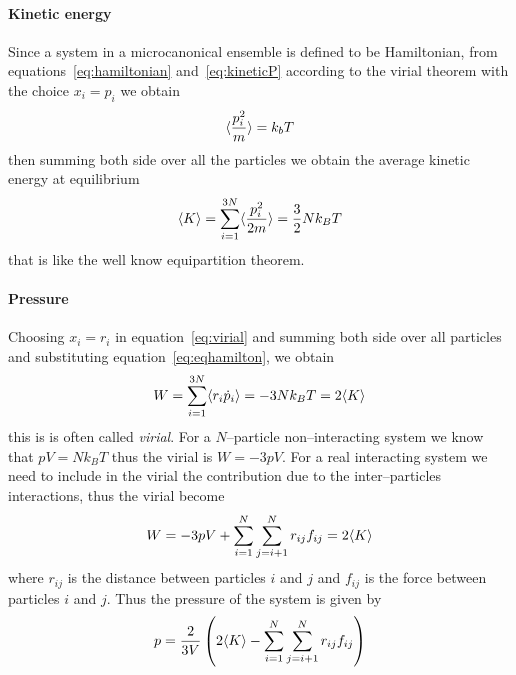 \paragraph{\textbf{Kinetic energy}} Since a system in a microcanonical ensemble is defined to be Hamiltonian, from equations~\eqref{eq:hamiltonian} and~\eqref{eq:kineticP} according to the virial theorem with the choice $x_i = p_i$ we obtain
\begin{equation*}
	\langle \frac{p^2_i}{m} \rangle = k_bT
\end{equation*}
then summing both side over all the particles we obtain the average kinetic energy at equilibrium
\begin{equation}
	\langle K \rangle = \sum_{i=1}^{3N} \langle \frac{p_i^2}{2m} \rangle = \frac{3}{2}Nk_B T
	\label{eq:kineticT}
\end{equation}
that is like the well know equipartition theorem.

\paragraph{\textbf{Pressure}} Choosing $x_i = r_i$ in equation~\eqref{eq:virial} and summing both side over all particles and substituting equation~\eqref{eq:eqhamilton}, we obtain
\begin{equation*}
	W = \sum_{i=1}^{3N} \langle r_i\dot p_i \rangle = -3Nk_B T = 2 \langle K \rangle
\end{equation*}
this is is often called \textit{virial}. For a $N$--particle non--interacting system we know that $pV = Nk_B T$ thus the virial is $W = -3pV$. For a real interacting system we need to include in the virial the contribution due to the inter--particles interactions, thus the virial become
\begin{equation*}
	W = -3pV + \sum_{i=1}^N\sum_{j=i+1}^Nr_{ij}f_{ij} = 2 \langle K \rangle
\end{equation*}
where $r_{ij}$ is the distance between particles $i$ and $j$ and $f_{ij}$ is the force between particles $i$ and $j$. Thus the pressure of the system is given by
\begin{equation}
	p = \frac{2}{3V}\left (2 \langle K \rangle - \sum_{i=1}^N\sum_{j=i+1}^Nr_{ij}f_{ij}\right )
	\label{eq:pressure}
\end{equation}

